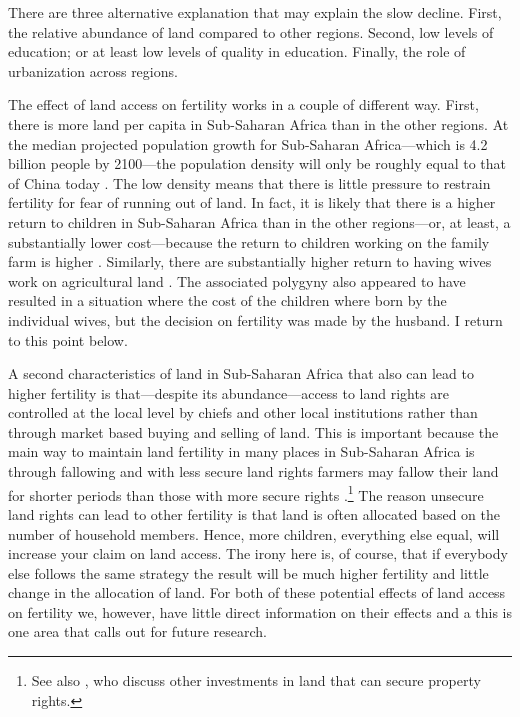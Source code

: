 \documentclass[]{article}
\begin{document}
There are three alternative explanation that may explain the slow decline. First, the relative abundance of land compared to other regions. Second, low levels of education; or at least low levels of quality in education. Finally, the role of urbanization across regions.

The effect of land access on fertility works in a couple of different way. First, there is more land per capita in Sub-Saharan Africa than in the other regions. At the median projected population growth for Sub-Saharan Africa---which is 4.2 billion people by 2100---the population density will only be roughly equal to that of China today \citep[p 235]{Gerland2014}. The low density means that there is little pressure to restrain fertility for fear of running out of land. In fact, it is likely that there is a higher return to children in Sub-Saharan Africa than in the other regions---or, at least, a substantially lower cost---because the return to children working on the family farm is higher \citep{Caldwell1992}. Similarly, there are substantially higher return to having wives work on agricultural land \citep{jacoby95}. The associated polygyny also appeared to have resulted in a situation where the cost of the children where born by the individual wives, but the decision on fertility was made by the husband. I return to this point below.

A second characteristics of land in Sub-Saharan Africa that also can lead to higher fertility is that---despite its abundance---access to land rights are controlled at the local level by chiefs and other local institutions rather than through market based buying and selling of land. This is important because the main way to maintain land fertility in many places in Sub-Saharan Africa is through fallowing and with less secure land rights farmers may fallow their land for shorter periods than those with more secure rights \citep{Goldstein2008}.\footnote{See also \citet{besley95c}, who discuss other investments in land that can secure property rights.} The reason unsecure land rights can lead to other fertility is that land is often allocated based on the number of household members. Hence, more children, everything else equal, will increase your claim on land access. The irony here is, of course, that if everybody else follows the same strategy the result will be much higher fertility and little change in the allocation of land. For both of these potential effects of land access on fertility we, however, have little direct information on their effects and a this is one area that calls out for future research.
\end{document}
